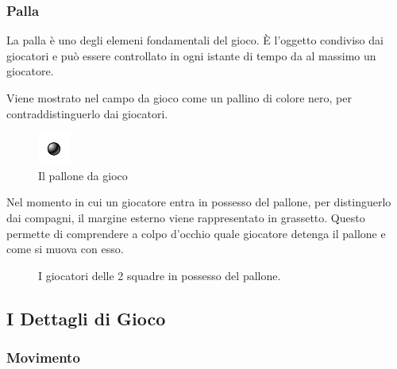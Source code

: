 \documentclass[aps,letterpaper,10pt]{article}
\begin{document}
\subsubsection{Palla}

La palla \`e uno degli elemeni fondamentali del gioco. \`E l'oggetto condiviso dai giocatori e pu\`o essere controllato
in ogni istante di tempo da al massimo un giocatore. \vspace{3mm}

Viene mostrato nel campo da gioco come un pallino di colore nero, per contraddistinguerlo dai giocatori.

\begin{figure}[H]
	\begin{center}
		\includegraphics[width=40px]{images/ball.pdf}
	\end{center}
\caption{Il pallone da gioco}
\end{figure}

Nel momento in cui un giocatore entra in possesso del pallone, per distinguerlo dai compagni, il margine esterno viene
rappresentato in grassetto. Questo permette di comprendere a colpo d'occhio quale giocatore detenga il pallone e come si
muova con esso.

\begin{figure}[H]
  \centering
    \hspace{1cm}             
  \caption{I giocatori delle 2 squadre in possesso del pallone.}
\end{figure}

\subsection{I Dettagli di Gioco}

\subsubsection{Movimento}
\label{movimento}
\end{document}

